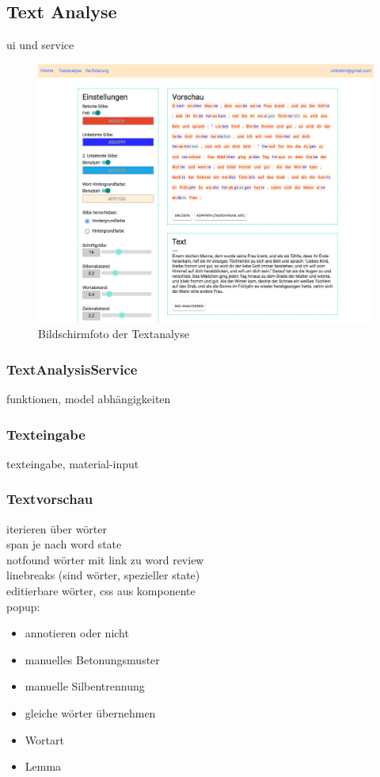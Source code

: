\subsection{Text Analyse}

ui und service

\begin{figure}[h!]
	\centering
	\includegraphics[width=.8\linewidth, frame]{figures/frontend/textanalyse}
	\caption{Bildschirmfoto der Textanalyse}
	\label{fig:frontend-textanalyse}
\end{figure}

\subsubsection{TextAnalysisService}

funktionen, model abhängigkeiten

\subsubsection{Texteingabe}

texteingabe, material-input\\

\subsubsection{Textvorschau}

iterieren über wörter\\
span je nach word state\\
notfound wörter mit link zu word review\\
linebreaks (sind wörter, spezieller state)\\

editierbare wörter, css aus komponente\\
popup:\\
\begin{itemize}
	\item annotieren oder nicht
	\item manuelles Betonungsmuster
	\item manuelle Silbentrennung
	\item gleiche wörter übernehmen
	\item Wortart
	\item Lemma
\end{itemize}

